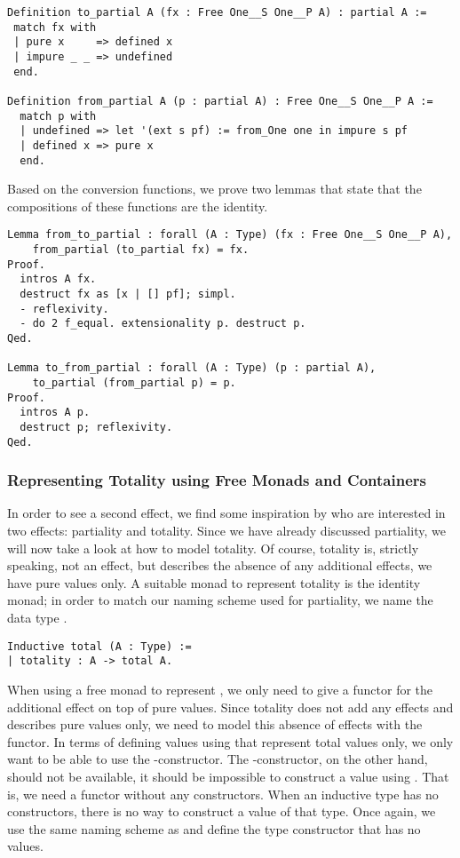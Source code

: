 \begin{verbatim}
Definition to_partial A (fx : Free One__S One__P A) : partial A :=
 match fx with
 | pure x     => defined x
 | impure _ _ => undefined
 end.

Definition from_partial A (p : partial A) : Free One__S One__P A :=
  match p with
  | undefined => let '(ext s pf) := from_One one in impure s pf
  | defined x => pure x
  end.
\end{verbatim}

Based on the conversion functions, we prove two lemmas that state that the compositions of these functions are the identity.

\begin{verbatim}
Lemma from_to_partial : forall (A : Type) (fx : Free One__S One__P A),
    from_partial (to_partial fx) = fx.
Proof.
  intros A fx.
  destruct fx as [x | [] pf]; simpl.
  - reflexivity.
  - do 2 f_equal. extensionality p. destruct p.
Qed.

Lemma to_from_partial : forall (A : Type) (p : partial A),
    to_partial (from_partial p) = p.
Proof.
  intros A p.
  destruct p; reflexivity.
Qed.
\end{verbatim}

\subsubsection{Representing Totality using Free Monads and Containers}
\label{subsub:totality_container}
In order to see a second effect, we find some inspiration by \citet{abel2005verifying} who are interested in two effects: partiality and totality.
Since we have already discussed partiality, we will now take a look at how to model totality.
Of course, totality is, strictly speaking, not an effect, but describes the absence of any additional effects, we have pure values only.
A suitable monad to represent totality is the identity monad; in order to match our naming scheme used for partiality, we name the data type .

\begin{verbatim}
Inductive total (A : Type) :=
| totality : A -> total A.
\end{verbatim}

When using a free monad to represent , we only need to give a functor for the additional effect on top of pure values.
Since totality does not add any effects and describes pure values only, we need to model this absence of effects with the functor.
In terms of defining values using  that represent total values only, we only want to be able to use the -constructor.
The -constructor, on the other hand, should not be available, it should be impossible to construct a value using .
That is, we need a functor without any constructors.
When an inductive type has no constructors, there is no way to construct a value of that type.
Once again, we use the same naming scheme as \citeauthor{swierstra2008data} and define the type constructor  that has no values.

